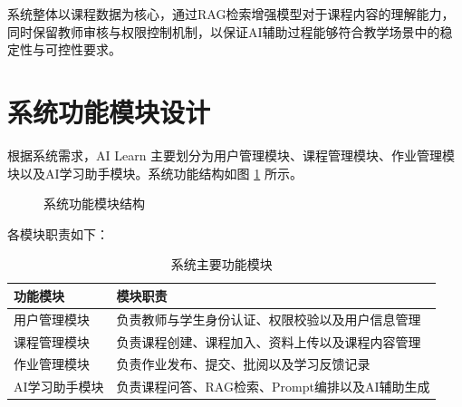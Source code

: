 \documentclass[12pt,a4paper,oneside]{ctexbook}
\numberwithin{equation}{chapter}
\begin{document}
系统整体以课程数据为核心，通过RAG检索增强模型对于课程内容的理解能力，同时保留教师审核与权限控制机制，以保证AI辅助过程能够符合教学场景中的稳定性与可控性要求。

\section{系统功能模块设计}

根据系统需求，AI Learn 主要划分为用户管理模块、课程管理模块、作业管理模块以及AI学习助手模块。系统功能结构如图 \ref{fig:functionModules} 所示。

\begin{figure}[H]
\centering


\caption{系统功能模块结构}
\label{fig:functionModules}

\end{figure}

各模块职责如下：

\begin{table}[H]
\centering
\caption{系统主要功能模块}
\label{tab:modules}
\begin{tabular}{p{4cm} p{9cm}}
\toprule
功能模块 & 模块职责 \\
\midrule

用户管理模块 &
负责教师与学生身份认证、权限校验以及用户信息管理 \\

课程管理模块 &
负责课程创建、课程加入、资料上传以及课程内容管理 \\

作业管理模块 &
负责作业发布、提交、批阅以及学习反馈记录 \\

AI学习助手模块 &
负责课程问答、RAG检索、Prompt编排以及AI辅助生成 \\

\bottomrule
\end{tabular}
\end{table}
\end{document}
